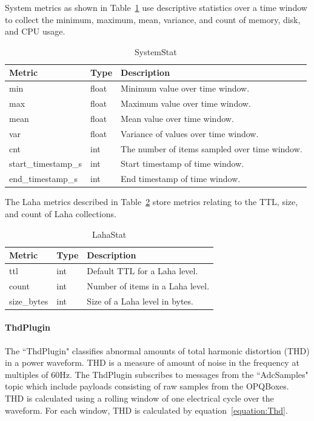 System metrics as shown in Table~\ref{table:MetricsSystemStat} use descriptive statistics over a time window to collect the minimum, maximum, mean, variance, and count of memory, disk, and CPU usage.

\begin{table}[H]
	\centering
	\caption{SystemStat}
	\begin{tabularx}{\textwidth}{llX}
		\toprule
		\textbf{Metric} & \textbf{Type} & \textbf{Description} \\
		\midrule
		min & float & Minimum value over time window. \\
		max & float & Maximum value over time window. \\
		mean & float & Mean value over time window. \\
		var & float & Variance of values over time window. \\
		cnt & int & The number of items sampled over time window. \\
		start\_timestamp\_s & int & Start timestamp of time window. \\
		end\_timestamp\_s & int & End timestamp of time window. \\
		\bottomrule
	\end{tabularx}
	\label{table:MetricsSystemStat}
\end{table}


The Laha metrics described in Table~\ref{table:MetricsLaha} store metrics relating to the TTL, size, and count of Laha collections.

\begin{table}[H]
	\centering
	\caption{LahaStat}
	\begin{tabularx}{\textwidth}{llX}
		\toprule
		\textbf{Metric} & \textbf{Type} & \textbf{Description} \\
		\midrule
		ttl & int & Default TTL for a Laha level. \\
		count & int & Number of items in a Laha level. \\
		size\_bytes & int & Size of a Laha level in bytes. \\
		\bottomrule
	\end{tabularx}
	\label{table:MetricsLaha}
\end{table}

\paragraph{ThdPlugin}
The ``ThdPlugin" classifies abnormal amounts of total harmonic distortion (THD) in a power waveform. THD is a measure of amount of noise in the frequency at multiples of 60Hz. The ThdPlugin subscribes to messages from the ``AdcSamples" topic which include payloads consisting of raw samples from the OPQBoxes. THD is calculated using a rolling window of one electrical cycle over the waveform. For each window, THD is calculated by equation~\ref{equation:Thd}.

